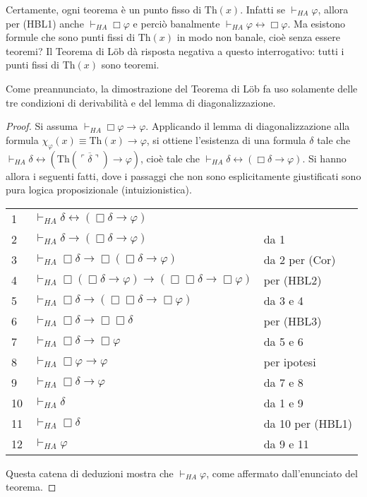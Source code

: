 Certamente, ogni teorema è un punto fisso di $\ensuremath{\mathrm{Th}}(x)$. Infatti se $\vdash_{HA}\varphi$, allora per (HBL1) anche $\vdash_{HA}\Box\varphi$ e perciò banalmente $\vdash_{HA}\varphi\leftrightarrow\Box\varphi$. Ma esistono formule che sono punti fissi di $\ensuremath{\mathrm{Th}}(x)$ in modo non banale, cioè senza essere teoremi? Il Teorema di L\"ob dà risposta negativa a questo interrogativo: tutti i punti fissi di $\ensuremath{\mathrm{Th}}(x)$ sono teoremi.

Come preannunciato, la dimostrazione del Teorema di L\"ob fa uso solamente delle tre condizioni di derivabilità e del lemma di diagonalizzazione.

\begin{proof} Si assuma $\vdash_{HA}\Box\varphi\to\varphi$. Applicando il lemma di dia\-go\-na\-liz\-za\-zio\-ne alla formula $\chi_{\varphi}(x)\equiv\ensuremath{\mathrm{Th}}(x)\to\varphi$, si ottiene l'esistenza di una formula $\delta$ tale che $\vdash_{HA}\delta\leftrightarrow(\ensuremath{\mathrm{Th}}(\overline{\ulcorner\delta\urcorner})\to\varphi)$, cioè tale che $\vdash_{HA}\delta\leftrightarrow(\Box\delta\to\varphi)$. Si hanno allora i seguenti fatti, dove i passaggi che non sono esplicitamente giustificati sono pura logica proposizionale (intuizionistica).\\

\begin{tabular}{l l l}
1 & $\vdash_{HA}\delta\leftrightarrow(\Box\delta\to\varphi)$ 														& 									 \\
2 & $\vdash_{HA}\delta\to(\Box\delta\to\varphi)$ 														& da 1							 \\
3 & $\vdash_{HA}\Box\delta\to\Box(\Box\delta\to\varphi)$ 										& da 2 per (Cor)		 \\
4 & $\vdash_{HA}\Box(\Box\delta\to\varphi)\to(\Box\Box\delta\to\Box\varphi)$ 		& per (HBL2)				\\
5 & $\vdash_{HA}\Box\delta\to(\Box\Box\delta\to\Box\varphi)$									& da 3 e 4					 \\
6 & $\vdash_{HA}\Box\delta\to\Box\Box\delta$															& per (HBL3)				 \\
7 & $\vdash_{HA}\Box\delta\to\Box\varphi$																	& da 5 e 6					 \\
8 & $\vdash_{HA}\Box\varphi\to\varphi$																		& per ipotesi				 \\
9 & $\vdash_{HA}\Box\delta\to\varphi$																			& da 7 e 8					 \\
10& $\vdash_{HA}\delta$																								& da 1 e 9					 \\
11&	$\vdash_{HA}\Box\delta$																						& da 10 per (HBL1)	\\
12& $\vdash_{HA}\varphi$																								 & da 9 e 11\\					
\end{tabular}

\noindent Questa catena di deduzioni mostra che $\vdash_{HA}\varphi$, come affermato dall'enunciato del teorema.
\end{proof}

